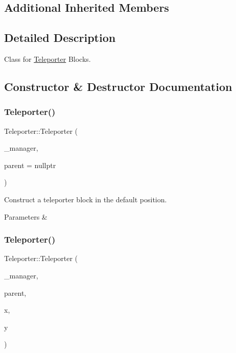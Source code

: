 \subsection*{Additional Inherited Members}


\subsection{Detailed Description}
Class for \mbox{\hyperlink{class_teleporter}{Teleporter}} Blocks. 

\subsection{Constructor \& Destructor Documentation}
\mbox{\label{class_teleporter_a9850270a926b752104203d4bbc60fcff}} 
\subsubsection{\texorpdfstring{Teleporter()}{Teleporter()}\hspace{0.1cm}{\footnotesize\ttfamily [1/3]}}
{\footnotesize\ttfamily Teleporter\+::\+Teleporter (\begin{DoxyParamCaption}\item[{\mbox{\hyperlink{class_game_manager}{Game\+Manager}} $\ast$}]{\+\_\+manager,  }\item[{\mbox{\hyperlink{class_game_entity}{Game\+Entity}} $\ast$}]{parent = {\ttfamily nullptr} }\end{DoxyParamCaption})}



Construct a teleporter block in the default position. 


\begin{DoxyParams}{Parameters}
{\em } & \\
\hline
\end{DoxyParams}
\mbox{\label{class_teleporter_ae501862b941bcf4a32fe15f998874f68}} 
\subsubsection{\texorpdfstring{Teleporter()}{Teleporter()}\hspace{0.1cm}{\footnotesize\ttfamily [2/3]}}
{\footnotesize\ttfamily Teleporter\+::\+Teleporter (\begin{DoxyParamCaption}\item[{\mbox{\hyperlink{class_game_manager}{Game\+Manager}} $\ast$}]{\+\_\+manager,  }\item[{\mbox{\hyperlink{class_game_entity}{Game\+Entity}} $\ast$}]{parent,  }\item[{float}]{x,  }\item[{float}]{y }\end{DoxyParamCaption})}



